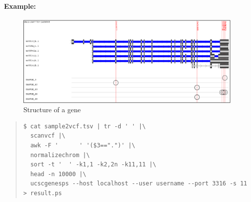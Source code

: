 \documentclass[12pt]{article}
\begin{document}
\paragraph{Example:}
\begin{figure}
\includegraphics[keepaspectratio=true,scale=0.45]{ucscgenes.eps}
\caption{Structure of a gene}
\end{figure}
\begin{quote}
\begin{verbatim}
$ cat sample2vcf.tsv | tr -d ' ' |\
  scanvcf |\
  awk -F '      ' '($3==".")' |\
  normalizechrom |\
  sort -t '  ' -k1,1 -k2,2n -k11,11 |\
  head -n 10000 |\
  ucscgenesps --host localhost --user username --port 3316 -s 11 > result.ps 
\end{verbatim}
\end{quote}



\end{document}
